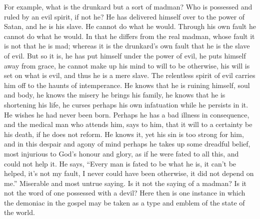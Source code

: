 For example, what is the drunkard but a sort of
madman? Who is possessed and ruled by an evil spirit, if not he? He
has delivered himself over to the power of Satan, and he is his slave.
He cannot do what he would. Through his own fault he cannot do what he
would. In that he differs from the real madman, whose fault it is not
that he is mad; whereas it is the drunkard's own fault that he is the
slave of evil. But so it is, he has put himself under the power of
evil, he puts himself away from grace, he cannot make up his mind to
will to be otherwise, his will is set on what is evil, and thus he is
a mere slave. The relentless spirit of evil carries him off to the
haunts of intemperance. He knows that he is ruining himself, soul and
body, he knows the misery he brings his family, he knows that he is
shortening his life, he curses perhaps his own infatuation while he
persists in it. He wishes he had never been born. Perhaps he has a bad
illness in consequence, and the medical man who attends him, says to
him, that it will to a certainty be his death, if he does not reform.
He knows it, yet his sin is too strong for him, and in this despair
and agony of mind perhaps he takes up some dreadful belief, most
injurious to God's honour and glory, as if he were fated to all this,
and could not help it. He says, ``Every man is fated to be what he
is, it can't be helped, it's not my fault, I never could have been
otherwise, it did not depend on me.'' Miserable and most untrue saying.
Is it not the saying of a madman? Is it not the word of one
possessed with a devil? Here then is one instance in which the
demoniac in the gospel may be taken as a type and emblem of the state
of the world.

